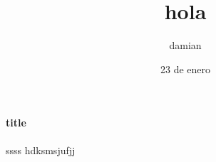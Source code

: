 \documentclass{article}
\author{damian}
\title{hola}
\date{23 de enero}
\begin{document}
\maketitle
\paragraph*{title}
ssss
hdksmsjufjj
\end{document}
